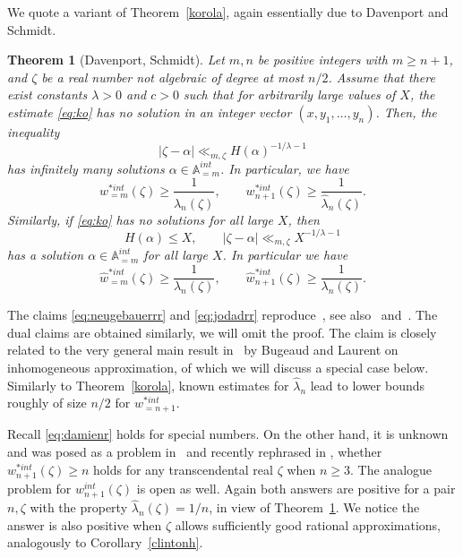 \documentclass[12pt]{amsart}
\newtheorem{theorem}{Theorem}[section]
\theoremstyle{definition}
\begin{document}
We quote a variant of Theorem~\ref{korola}, again
essentially due to Davenport and Schmidt.


\begin{theorem}[Davenport, Schmidt] \label{ppp}
Let $m,n$ be positive integers with $m\geq n+1$, 
and $\zeta$ be a real number not algebraic 
of degree at most $n/2$. Assume that there
exist constants $\lambda>0$ and $c>0$ such that 
for arbitrarily large values of $X$, the estimate \eqref{eq:ko} has no solution in an integer vector $(x,y_{1},\ldots,y_{n})$.
Then, the inequality
%
\begin{equation} \label{eq:neugebauerrr} 
\vert \zeta-\alpha\vert \ll_{m,\zeta} H(\alpha)^{-1/\lambda-1}
\end{equation}
%  
has infinitely many solutions $\alpha\in \mathbb{A}_{=m}^{int}$.
In particular, we have 
%
\begin{equation} \label{eq:jodadrr}
w_{=m}^{\ast int}(\zeta)\geq \frac{1}{\widehat{\lambda}_{n}(\zeta)}, \qquad w_{n+1}^{\ast int}(\zeta)\geq \frac{1}{\widehat{\lambda}_{n}(\zeta)}.
\end{equation}
% 
Similarly, if \eqref{eq:ko} has no solutions for all large $X$, then 
%
\begin{equation} \label{eq:formunirr}
H(\alpha)\leq X, \qquad \vert \zeta-\alpha\vert \ll_{m,\zeta} X^{-1/\lambda-1} 
\end{equation}
%
has a solution $\alpha\in \mathbb{A}_{=m}^{int}$ for all large $X$. In particular we have 
%
\begin{equation} \label{eq:dregsrr}
\widehat{w}_{=m}^{\ast int}(\zeta)\geq \frac{1}{\lambda_{n}(\zeta)}, \qquad \widehat{w}_{n+1}^{\ast int}(\zeta)\geq \frac{1}{\lambda_{n}(\zeta)}.
\end{equation}
%
\end{theorem}

The claims \eqref{eq:neugebauerrr} and \eqref{eq:jodadrr} reproduce~\cite[Lemma~1]{davsh},
see also~\cite[Theorem~2.11]{bugbuch} and~\cite{teuallein}. The dual claims are obtained similarly, we will omit the proof.
The claim is closely related to the very general main 
result in~\cite{bula} 
by Bugeaud and Laurent on inhomogeneous approximation, of which we will discuss a special case below.
Similarly to Theorem~\ref{korola}, known estimates 
for $\widehat{\lambda}_{n}$ lead
to lower bounds roughly of size $n/2$ for $w_{=n+1}^{\ast int}$.

Recall \eqref{eq:damienr} holds for special numbers. On the other hand,
it is unknown and was posed as a problem in~\cite{bugbuch} and recently rephrased in \cite{bdraft},
whether $w_{n+1}^{\ast int}(\zeta)\geq n$
holds for any transcendental real $\zeta$ when $n\geq 3$. The analogue problem 
for $w_{n+1}^{int}(\zeta)$ is open as well. Again both answers are positive for a pair $n,\zeta$ with
the property $\widehat{\lambda}_{n}(\zeta)=1/n$, 
in view of Theorem~\ref{ppp}. We notice the answer is also positive
when $\zeta$ allows sufficiently good rational approximations, analogously to Corollary~\ref{clintonh}.
\end{document}
